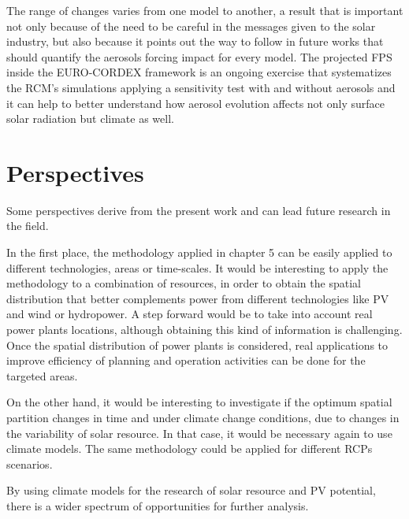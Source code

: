   The range of changes varies from one model to another, a result that is important not only because of the need to be careful in the messages given to the solar industry, but also because it points out the way to follow in future works that should quantify the aerosols forcing impact for every model. The projected FPS inside the EURO-CORDEX framework is an ongoing exercise that systematizes the RCM's simulations applying a sensitivity test with and without aerosols and it can help to better understand how aerosol evolution affects not only surface solar radiation but climate as well.

\chapter{Perspectives\label{perspectives}}

Some perspectives derive from the present work and can lead future research in the field.

In the first place, the methodology applied in chapter 5 can be easily applied to different technologies, areas or time-scales. It would be interesting to apply the methodology to a combination of resources, in order to obtain the spatial distribution that better complements power from different technologies like PV and wind or hydropower. A step forward would be to take into account real power plants locations, although obtaining this kind of information is challenging. Once the spatial distribution of power plants is considered, real applications to improve efficiency of planning and operation activities can be done for the targeted areas.

On the other hand, it would be interesting to investigate if the optimum spatial partition changes in time and under climate change conditions, due to changes in the variability of solar resource. In that case, it would be necessary again to use climate models. The same methodology could be applied for different RCPs scenarios. 

By using climate models for the research of solar resource and PV potential, there is a wider spectrum of opportunities for further analysis.

